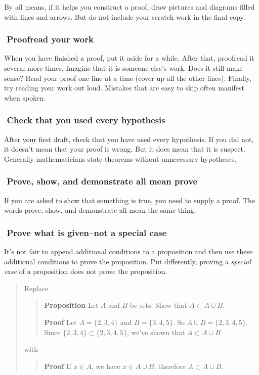 \documentclass[12pt,fleqn]{article}
\newcounter{ex}\setcounter{ex}{0}
\newcommand{\ex}{%
\hspace{-0.2in} \setcounter{ex}{\value{ex}+1}
\theex \,\,}
\newcounter{id}\setcounter{id}{0}
\newcounter{se}\setcounter{se}{0}
\begin{document}
By all means, if it helps you construct a proof, draw pictures and
diagrams filled with lines and arrows.  But do not include your scratch
work in the final copy.

\subsubsection*{\ex Proofread your work}

When you have finished a proof, put it aside for a while.  After that,
proofread it several more times. Imagine that it is someone else's
work.  Does it still make sense?  Read your proof one line at a time
(cover up all the other lines). Finally, try reading your work out
loud. Mistakes that are easy to skip often manifest when spoken.


\subsubsection*{\ex Check that you used every hypothesis}

After your first draft, check that you have used every hypothesis.
If you did not, it doesn't mean that your proof is wrong.  But it
does mean that it is  suspect.  Generally mathematicians
state theorems without unnecessary hypotheses.

\subsubsection*{\ex Prove, show, and demonstrate all mean prove}

If you are asked to show that something is true, you need to
supply a proof.  The words prove, show, and demonstrate all mean the
same thing. 

\subsubsection*{\ex Prove what is given--not a special case}

It's not fair to append additional conditions to a proposition and 
then use these additional conditions to prove the proposition.  Put
differently, proving a {\em special case\/} of a proposition does not
prove the proposition. 

\begin{quote}
Replace
\begin{quote}
 \textbf {Proposition} Let \(A\) and \(B\) be sets.  Show that 
\(A \subset A \cup B\).

\vspace{0.1in}

\textbf{Proof} Let \(A = \{2,3,4\}\) and \(B = \{3,4,5\}\).  So
\mbox{\(A \cup B = \{2,3,4,5\}\)}.  Since \(\{2,3,4\} \subset \{2,3,4,5\}\),
we've shown that \(A \subset A \cup B\)
\end{quote}
with
\begin{quote}
 \textbf {Proof}  If \(x \in A\), we have \(x \in A \cup B\); therefore
\(A \subset A \cup B\).
\end{quote}
\end{quote}
\end{document}
